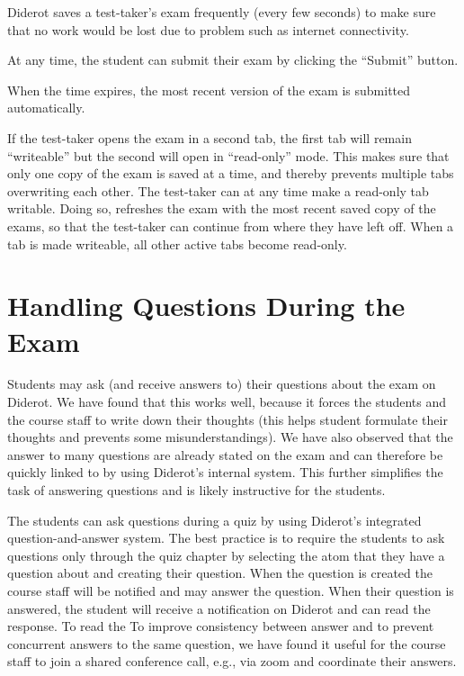 \begin{gram}
Diderot saves a test-taker's exam frequently (every few seconds) to make sure that no work would be lost due to problem such as internet connectivity.  

At any time, the student can submit their exam by clicking the ``Submit'' button.

When the time expires, the most recent version of the exam is submitted automatically.

If the test-taker opens the exam in a second tab, the first tab will remain ``writeable'' but the second will open in ``read-only'' mode.  
%
This makes sure that only one copy of the exam is saved at a time, and thereby prevents multiple tabs overwriting each other.
%
The test-taker can at any time make a read-only tab writable.  Doing
so, refreshes the exam with the most recent saved copy of the exams,
so that the test-taker can continue from where they have left off.  
%
When a tab is made writeable, all other active tabs become read-only.


\end{gram}


\section{Handling Questions During the Exam}

Students may ask (and receive answers to) their questions about the
exam on Diderot.
%
We have found that this works well, because it forces the students and
the course staff to write down their thoughts (this helps student
formulate their thoughts and prevents some misunderstandings).
%
We have also observed that the answer to many questions are already
stated on the exam and can therefore be quickly linked to by using
Diderot's internal  system.
%
This further simplifies the task of answering questions and is likely
instructive for the students.


The students can ask questions during a quiz by using Diderot's
integrated question-and-answer system.
%
The best practice is to require the students to ask questions only
through the quiz chapter by selecting the atom that they have a
question about and creating their question.
%
When the question is created the course staff will be notified and may answer the question. 
%
When their question is answered, the student will receive a notification on Diderot and can read the response.
%
To read the 
%
To improve consistency between answer and to prevent concurrent answers to the same question, we have found it useful for the course staff to join a shared conference call, e.g., via zoom and coordinate their answers. 

